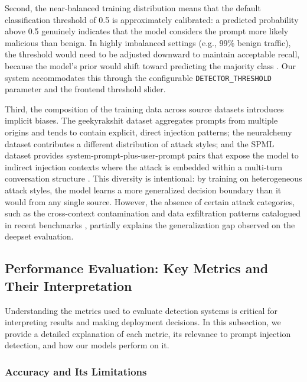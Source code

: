 \documentclass[12pt, letterpaper]{article}   %
\begin{document}
Second, the near-balanced training distribution means that the default classification threshold of 0.5 is approximately calibrated: a predicted probability above 0.5 genuinely indicates that the model considers the prompt more likely malicious than benign. In highly imbalanced settings (e.g., 99\% benign traffic), the threshold would need to be adjusted downward to maintain acceptable recall, because the model's prior would shift toward predicting the majority class \cite{ref28}. Our system accommodates this through the configurable \texttt{DETECTOR\_THRESHOLD} parameter and the frontend threshold slider.

Third, the composition of the training data across source datasets introduces implicit biases. The geekyrakshit dataset aggregates prompts from multiple origins and tends to contain explicit, direct injection patterns; the neuralchemy dataset contributes a different distribution of attack styles; and the SPML dataset provides system-prompt-plus-user-prompt pairs that expose the model to indirect injection contexts where the attack is embedded within a multi-turn conversation structure \cite{ref1}\cite{ref33}. This diversity is intentional: by training on heterogeneous attack styles, the model learns a more generalized decision boundary than it would from any single source. However, the absence of certain attack categories, such as the cross-context contamination and data exfiltration patterns catalogued in recent benchmarks \cite{ref34}, partially explains the generalization gap observed on the deepset evaluation.


\subsection{Performance Evaluation: Key Metrics and Their Interpretation}

Understanding the metrics used to evaluate detection systems is critical for interpreting results and making deployment decisions. In this subsection, we provide a detailed explanation of each metric, its relevance to prompt injection detection, and how our models perform on it.

\subsubsection{Accuracy and Its Limitations}
\end{document}

